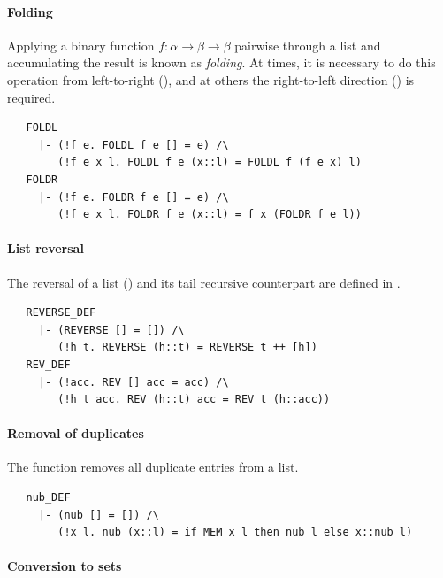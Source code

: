 \paragraph {Folding}

Applying a binary function $f : \alpha\to\beta\to\beta$ pairwise
through a list and accumulating the result is known as
\emph{folding}. At times, it is necessary to do this operation
from left-to-right (), and at others the
right-to-left direction () is required.
\begin{hol}
\begin{verbatim}
   FOLDL
     |- (!f e. FOLDL f e [] = e) /\
        (!f e x l. FOLDL f e (x::l) = FOLDL f (f e x) l)
   FOLDR
     |- (!f e. FOLDR f e [] = e) /\
        (!f e x l. FOLDR f e (x::l) = f x (FOLDR f e l))
\end{verbatim}
\end{hol}

\paragraph {List reversal}

The reversal of a list () and its tail recursive
counterpart  are defined in .
\begin{hol}
\begin{verbatim}
   REVERSE_DEF
     |- (REVERSE [] = []) /\
        (!h t. REVERSE (h::t) = REVERSE t ++ [h])
   REV_DEF
     |- (!acc. REV [] acc = acc) /\
        (!h t acc. REV (h::t) acc = REV t (h::acc))
\end{verbatim}
\end{hol}

\paragraph {Removal of duplicates}
The  function removes all duplicate entries from a list.
\begin{hol}
\begin{verbatim}
   nub_DEF
     |- (nub [] = []) /\
        (!x l. nub (x::l) = if MEM x l then nub l else x::nub l)
\end{verbatim}
\end{hol}

\paragraph {Conversion to sets}

